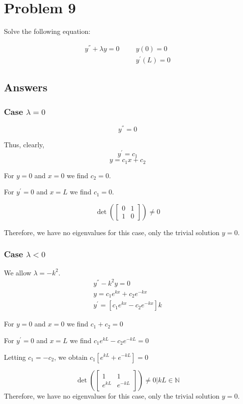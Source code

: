 \documentclass{article}
\begin{document}
\section*{Problem 9}

Solve the following equation:

\begin{align}\label{9}
y^{''} + \lambda y =0 && &y(0) = 0 \\
&& &y^{'}(L) =0 \nonumber
\end{align}

\subsection*{Answers}
\subsubsection*{Case $\lambda=0$}
$$ y^{''}=0 $$

Thus, clearly,
$$y^{'} = c_1$$
$$y = c_1 x + c_2 $$

For $y=0$ and $x=0$ we find $c_2 = 0$.

For $y^{'}=0$ and $x=L$ we find $c_1=0$.

$$\det \left( \begin{bmatrix} 0 & 1 \\ 1 & 0 \end{bmatrix} \right) \neq 0$$

Therefore, we have no eigenvalues for this case, only the trivial solution $y=0$.

\subsubsection*{Case $\lambda < 0$}
We allow $\lambda = -k^2$.
\begin{align*}
y^{''}-k^{2}y=0 \\
y = c_1 e^{kx} + c_2 e^{-kx} \\
y^{'} = \left[c_1 e^{kx} - c_2 e^{-kx}\right] k
\end{align*}

For $y=0$ and $x=0$ we find $c_1+c_2=0$

For $y^{'}=0$ and $x=L$ we find $c_1 e^{kL} - c_2 e^{-kL} = 0$

Letting $c_1 = -c_2$, we obtain $c_1\left[ e^{kL} +e^{-kL}\right] = 0$

$$\det \left( \begin{bmatrix} 1 & 1 \\ e^{kL} & e^{-kL} \end{bmatrix} \right) \neq 0\Bigr|  kL\in\mathbb{N} $$
Therefore, we have no eigenvalues for this case, only the trivial solution $y=0$.
\end{document}
